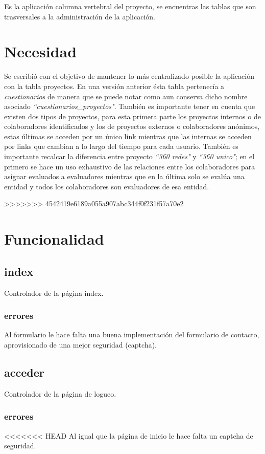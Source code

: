 \documentclass[10pt,a4paper]{book}
\begin{document}
	Es la aplicación columna vertebral del proyecto, se encuentras las tablas que son trasversales a la administración de la aplicación.

	\section{Necesidad}
	
	Se escribió con el objetivo de mantener lo más centralizado posible la aplicación con la tabla proyectos. En una versión anterior ésta tabla pertenecía a \textit{cuestionarios} de manera que se puede notar como aun conserva dicho nombre asociado \textit{``cuestionarios\_proyectos"}. También es importante tener en cuenta que existen dos tipos de proyectos, para esta primera parte los proyectos internos o de colaboradores identificados y los de proyectos externos o colaboradores anónimos, estas últimas se acceden por un único link mientras que las internas se acceden por links que cambian a lo largo del tiempo para cada usuario. También es importante recalcar la diferencia entre proyecto \textit{``360 redes"} y \textit{``360 unico"}; en el primero se hace un uso exhaustivo de las relaciones entre los colaboradores para asignar evaluados a evaluadores mientras que en la última solo se evalúa una entidad y todos los colaboradores son evaluadores de esa entidad.
	
>>>>>>> 4542419e6189a055a907abc344f0f231f57a70e2
	\section{Funcionalidad}

	\subsection{index}
	Controlador de la página index.

	\subsubsection{errores} Al formulario le hace falta una buena implementación del formulario de contacto, aprovisionado de una mejor seguridad (captcha).


	\subsection{acceder}
	Controlador de la página de logueo.

	\subsubsection{errores}
<<<<<<< HEAD
	Al igual que la página de inicio le hace falta un captcha de seguridad.
\end{document}
